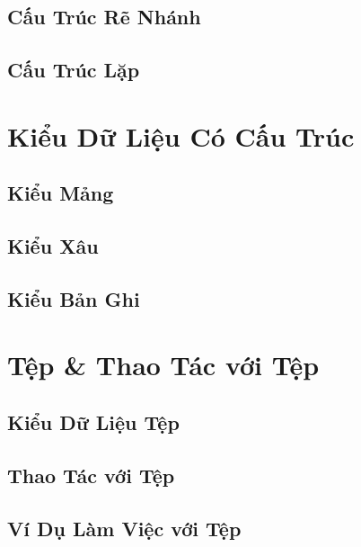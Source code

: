 \documentclass[oneside]{book}
\numberwithin{equation}{section}
\begin{document}
\section{Cấu Trúc Rẽ Nhánh}

\section{Cấu Trúc Lặp}


\chapter{Kiểu Dữ Liệu Có Cấu Trúc}

\section{Kiểu Mảng}

\section{Kiểu Xâu}

\section{Kiểu Bản Ghi}


\chapter{Tệp \& Thao Tác với Tệp}

\section{Kiểu Dữ Liệu Tệp}

\section{Thao Tác với Tệp}

\section{Ví Dụ Làm Việc với Tệp}

\end{document}
